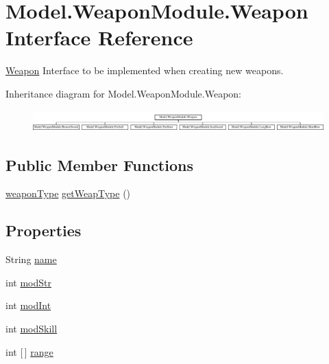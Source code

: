 \hypertarget{interface_model_1_1_weapon_module_1_1_weapon}{}\section{Model.\+Weapon\+Module.\+Weapon Interface Reference}
\label{interface_model_1_1_weapon_module_1_1_weapon}


\hyperlink{interface_model_1_1_weapon_module_1_1_weapon}{Weapon} Interface to be implemented when creating new weapons.  


Inheritance diagram for Model.\+Weapon\+Module.\+Weapon\+:\begin{figure}[H]
\begin{center}
\leavevmode
\includegraphics[height=0.822320cm]{interface_model_1_1_weapon_module_1_1_weapon}
\end{center}
\end{figure}
\subsection*{Public Member Functions}
\begin{DoxyCompactItemize}
\item 
\hyperlink{namespace_model_1_1_weapon_module_a3390c266f89e3399c2bc7fa31f13cbec}{weapon\+Type} \hyperlink{interface_model_1_1_weapon_module_1_1_weapon_a175133855ef446d3d87c70d13979be9c}{get\+Weap\+Type} ()
\end{DoxyCompactItemize}
\subsection*{Properties}
\begin{DoxyCompactItemize}
\item 
String \hyperlink{interface_model_1_1_weapon_module_1_1_weapon_a936ccba78ba21dbfb324794f80d90d14}{name}
\item 
int \hyperlink{interface_model_1_1_weapon_module_1_1_weapon_a80957476be2d0f5fe7c18a59debf6386}{mod\+Str}
\item 
int \hyperlink{interface_model_1_1_weapon_module_1_1_weapon_ac832d8b53ee20443375fd0a679d47814}{mod\+Int}
\item 
int \hyperlink{interface_model_1_1_weapon_module_1_1_weapon_a6718e7fbef49311b7649db6c7af46243}{mod\+Skill}
\item 
int \mbox{[}$\,$\mbox{]} \hyperlink{interface_model_1_1_weapon_module_1_1_weapon_ae96061ff5fea0e732d63d5b9da0b392c}{range}
\end{DoxyCompactItemize}


